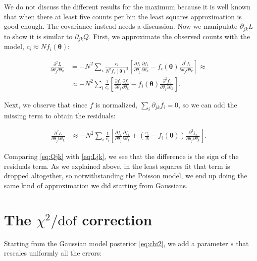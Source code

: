 We do not discuss the different results for the maximum because it is well
known that when there at least five counts per bin the least squares
approximation is good enough. The covariance instead needs a discussion. Now we
manipulate $\partial_{jk} L$ to show it is similar to $\partial_{jk} Q$. First,
we approximate the observed counts with the model, $c_i \approx N
f_i(\boldsymbol\theta)$:

\begin{align}
    \frac {\partial^2 L} {\partial\theta_j \partial\theta_k} &=
    -N^2 \sum_i \frac {c_i} {N^2 f_i(\boldsymbol\theta)^2} \left[
    \frac {\partial f_i} {\partial \theta_j}
    \frac {\partial f_i} {\partial \theta_k}
    - f_i(\boldsymbol\theta)
    \frac {\partial^2 f_i} {\partial\theta_j \partial\theta_k}
    \right] \approx \\
    &\approx
    -N^2 \sum_i \frac 1 {c_i} \left[
    \frac {\partial f_i} {\partial \theta_j}
    \frac {\partial f_i} {\partial \theta_k}
    - f_i(\boldsymbol\theta)
    \frac {\partial^2 f_i} {\partial\theta_j \partial\theta_k}
    \right].
\end{align}

Next, we observe that since $f$ is normalized, $\sum_i \partial_{jk} f_i = 0$,
so we can add the missing term to obtain the residuals:

\begin{align}
    \frac {\partial^2 L} {\partial\theta_j \partial\theta_k} &\approx
    -N^2 \sum_i \frac 1 {c_i} \left[
    \frac {\partial f_i} {\partial \theta_j}
    \frac {\partial f_i} {\partial \theta_k}
    + \left( \frac {c_i} N - f_i(\boldsymbol\theta) \right)
    \frac {\partial^2 f_i} {\partial\theta_j \partial\theta_k}
    \right]. \label{eq:Ljk}
\end{align}

Comparing \eqref{eq:Qjk} with \eqref{eq:Ljk}, we see that the difference is the
sign of the residuals term. As we explained above, in the least squares fit
that term is dropped altogether, so notwithstanding the Poisson model, we end
up doing the same kind of approximation we did starting from Gaussians.

\section{The $\chi^2/\mathrm{dof}$ correction}

Starting from the Gaussian model posterior \eqref{eq:chi2}, we add a parameter
$s$ that rescales uniformly all the errors:

